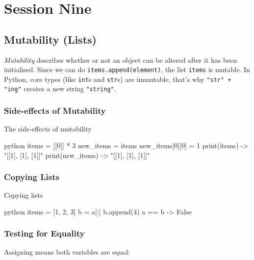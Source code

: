 \section{Session Nine}\label{sec:session_nine}

\subsection{Mutability (Lists)}\label{sub:mutability}

\emph{Mutability} describes whether or not an object can be altered after it has been initialised.
Since we can do \texttt{items.append(element)}, the list \texttt{items} is mutable.
In Python, core types (like \texttt{int}s and \texttt{str}s) are immutable, that's why \texttt{"str" + "ing"} creates a new string \texttt{"string"}.

\subsubsection{Side-effects of Mutability}\label{ssub:side_effects_of_mutability}

\begin{highlight}{The side-effects of mutability}
    \begin{code}{python}
		items = [[0]] * 3
		new_items = items
		new_items[0][0] = 1
		print(items) -> "[[1], [1], [1]]"
		print(new_items) -> "[[1], [1], [1]]"
    \end{code}
\end{highlight}

\subsubsection{Copying Lists}\label{ssub:copying_lists}

\begin{highlight}{Copying lists}
    \begin{code}{python}
		items = [1, 2, 3]
		b = a[:]
		b.append(4)
		a == b -> False
    \end{code}
\end{highlight}

\subsubsection{Testing for Equality}\label{ssub:testing_for_equality}

\noindent
Assigning means both variables are equal:

